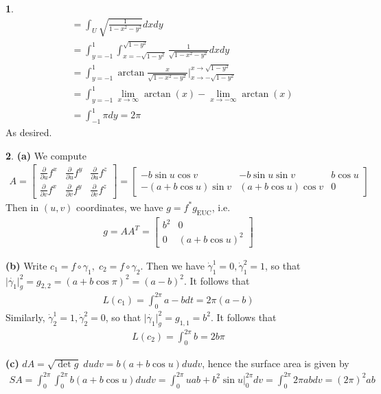 \documentclass[10.5pt]{article}
\theoremstyle{definition}
\newtheorem{pb}{}
\newcommand{\abs}[1]{\lvert#1\rvert}
\newcommand{\paru}{\frac{\partial}{\partial u}}
\newcommand{\parv}{\frac{\partial}{\partial v}}
\begin{document}
\begin{pb}
\begin{align*}
            &= \int_U \sqrt{\frac{1}{1-x^2-y^2}}dxdy \\
            &= \int_{y=-1}^1 \int_{x=-\sqrt{1-y^2}}^{\sqrt{1-y^2}} \frac{1}{\sqrt{1-x^2-y^2}}dxdy \\
            &= \int_{y=-1}^1 \arctan \frac{x}{\sqrt{1-x^2-y^2}}\vert_{x \to -\sqrt{1-y^2}}^{x \to \sqrt{1-y^2}} \\
            &= \int_{y=-1}^1 \lim_{x \to \infty}\arctan(x) - \lim_{x \to -\infty}\arctan(x) \\
            &= \int_{-1}^1 \pi dy = 2\pi
        \end{align*}
        As desired.
    \end{pb}
    \begin{pb}
        \textbf{(a)} We compute
        \begin{align*}
            A = \begin{bmatrix} \paru f^x & \paru f^y & \paru f^z \\
                \parv f^x & \parv f^y & \parv f^z  \end{bmatrix}
            = \begin{bmatrix} -b\sin u\cos v & -b\sin u \sin v &b\cos u\\
            -(a+b\cos u)\sin v & (a+b\cos u)\cos v & 0 \end{bmatrix}
        \end{align*}
        Then in \((u,v)\) coordinates, we have \(g = f^* g_{\text{EUC}}\), i.e.
        \begin{align*}
            g = AA^T = \begin{bmatrix} b^2 & 0 \\ 0 & (a+b\cos u)^2 \end{bmatrix}
        \end{align*}

        \textbf{(b)} Write \(c_1 = f\circ \gamma_1, \; c_2 = f\circ \gamma_2\). Then we have
        \(\dot{\gamma}_1^1 = 0, \dot{\gamma}_1^2 = 1\), so that \(\abs{\dot{\gamma_1}}^2_g = g_{2,2} = (a+b\cos \pi)^2 = (a-b)^2\). It follows that
        \begin{align*}
            L(c_1) = \int_0^{2\pi} a-b dt = 2\pi(a-b)
        \end{align*}
        Similarly, \(\dot{\gamma}_2^1 = 1, \dot{\gamma}_2^2 = 0\), so that \(\abs{\dot{\gamma_1}}^2_g = g_{1,1} = b^2\). It follows that
        \begin{align*}
            L(c_2) = \int_0^{2\pi}b = 2b\pi
        \end{align*}

        \textbf{(c)}
        \(dA = \sqrt{\det g}\;dudv = b(a+b\cos u)dudv\), hence the surface area is given by
        \begin{align*}
            SA = \int_0^{2\pi}\int_0^{2\pi}b(a+b\cos u)dudv = \int_0^{2\pi} uab + b^2\sin u\vert_0^{2\pi}dv = \int_0^{2\pi} 2\pi abdv = (2\pi)^2ab
        \end{align*}
    \end{pb}
\end{document}
